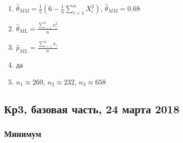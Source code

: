 \begin{enumerate}
\item $\hat{\theta}_{MM} = \frac{1}{5}\left(6 - \frac{1}{n}\sum_{i=1}^n X_i^2 \right)$, $\hat{\theta}_{MM} = 0.68$
\item $\hat{\theta}_{ML} = \frac{\sum_{i=1}^n x_i^2}{n}$
\item $\hat{p}_{ML} = \frac{\sum_{i=1}^n x_i}{n}$
\item да
\item $n_1 \approx 260$, $n_2 \approx 232$, $n_3 \approx 658$

\end{enumerate}




\subsection{Кр3, базовая часть, 24 марта 2018}


	\subsubsection{Минимум}

